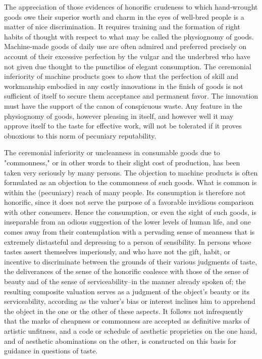 \documentclass[12pt]{report}
\begin{document}
The appreciation of those evidences of honorific crudeness to which
hand-wrought goods owe their superior worth and charm in the eyes
of well-bred people is a matter of nice discrimination. It requires
training and the formation of right habits of thought with respect to
what may be called the physiognomy of goods. Machine-made goods of
daily use are often admired and preferred precisely on account of their
excessive perfection by the vulgar and the underbred who have not given
due thought to the punctilios of elegant consumption. The ceremonial
inferiority of machine products goes to show that the perfection of
skill and workmanship embodied in any costly innovations in the finish
of goods is not sufficient of itself to secure them acceptance and
permanent favor. The innovation must have the support of the canon of
conspicuous waste. Any feature in the physiognomy of goods, however
pleasing in itself, and however well it may approve itself to the taste
for effective work, will not be tolerated if it proves obnoxious to this
norm of pecuniary reputability.

The ceremonial inferiority or uncleanness in consumable goods due to
"commonness," or in other words to their slight cost of production,
has been taken very seriously by many persons. The objection to machine
products is often formulated as an objection to the commonness of such
goods. What is common is within the (pecuniary) reach of many people.
Its consumption is therefore not honorific, since it does not serve the
purpose of a favorable invidious comparison with other consumers. Hence
the consumption, or even the sight of such goods, is inseparable from an
odious suggestion of the lower levels of human life, and one comes away
from their contemplation with a pervading sense of meanness that is
extremely distasteful and depressing to a person of sensibility. In
persons whose tastes assert themselves imperiously, and who have not the
gift, habit, or incentive to discriminate between the grounds of
their various judgments of taste, the deliverances of the sense of the
honorific coalesce with those of the sense of beauty and of the sense of
serviceability--in the manner already spoken of; the resulting
composite valuation serves as a judgment of the object's beauty or its
serviceability, according as the valuer's bias or interest inclines him
to apprehend the object in the one or the other of these aspects. It
follows not infrequently that the marks of cheapness or commonness
are accepted as definitive marks of artistic unfitness, and a code or
schedule of aesthetic proprieties on the one hand, and of aesthetic
abominations on the other, is constructed on this basis for guidance in
questions of taste.
\end{document}
